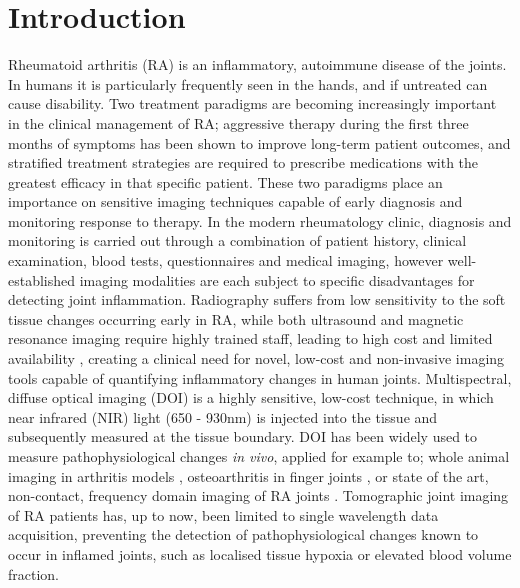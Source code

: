 \documentclass[twoside]{bhamthesis}
\theoremstyle{definition}
\begin{document}
\listoffigures
\listoftables
\doublespacing

\mainmatter

\chapter{Introduction}

\label{Introduction}

Rheumatoid arthritis (RA) is an inflammatory, autoimmune disease of the joints. In humans it is particularly frequently seen in the hands, and if untreated can cause disability. Two treatment paradigms are becoming increasingly important in the clinical management of RA; aggressive therapy during the first three months of symptoms has been shown to improve long-term patient outcomes, and stratified treatment strategies are required to prescribe medications with the greatest efficacy in that specific patient. These two paradigms place an importance on sensitive imaging techniques capable of early diagnosis and monitoring response to therapy. In the modern rheumatology clinic, diagnosis and monitoring is carried out through a combination of patient history, clinical examination, blood tests, questionnaires and medical imaging, however well-established imaging modalities are each subject to specific disadvantages for detecting joint inflammation. Radiography suffers from low sensitivity to the soft tissue changes occurring early in RA, while both ultrasound and magnetic resonance imaging require highly trained staff, leading to high cost and limited availability \cite{golovko2011optical}, creating a clinical need for novel, low-cost and non-invasive imaging tools capable of quantifying inflammatory changes in human joints. Multispectral, diffuse optical imaging (DOI) is a highly sensitive, low-cost technique, in which near infrared (NIR) light (650 - 930nm) is injected into the tissue and subsequently measured at the tissue boundary. DOI has been widely used to measure pathophysiological changes \textit{in vivo}, applied for example to; whole animal imaging in arthritis models \cite{glinton2017diagnosing}, osteoarthritis in finger joints \cite{yuan2007three}, or state of the art, non-contact, frequency domain imaging of RA joints \cite{hielscher2011frequency}. Tomographic joint imaging of RA patients has, up to now, been limited to single wavelength data acquisition, preventing the detection of pathophysiological changes known to occur in inflamed joints, such as localised tissue hypoxia or elevated blood volume fraction.
\end{document}
